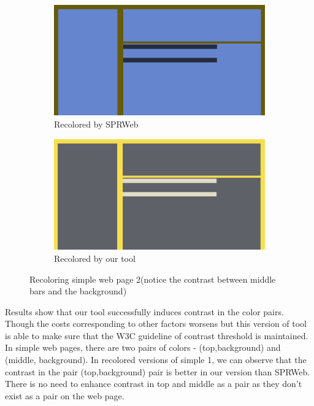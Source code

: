 \begin{figure}
\centering
\begin{subfigure}{.5\textwidth}
  \centering
  \includegraphics[width=0.9\linewidth]{recoloredSprweb2.png}
  \caption{Recolored by SPRWeb}
  \label{fig:sub1}
\end{subfigure}%
\begin{subfigure}{.5\textwidth}
  \centering
  \includegraphics[width=0.9\linewidth]{recoloredOurs2.png}
  \caption{Recolored by our tool}
  \label{fig:sub2}
\end{subfigure}
\caption{Recoloring simple web page 2(notice the contrast between middle bars and the background)}
\label{fig:test}
\end{figure}

Results show that our tool successfully induces contrast in the color pairs. Though the costs corresponding to other factors worsens but this version of tool is able to make sure that the W3C guideline of contrast threshold is maintained. In simple web pages, there are two pairs of colors - (top,background) and (middle, background). In recolored versions of simple 1, we can observe that the contrast in the pair (top,background) pair is better in our version than SPRWeb. There is no need to enhance contrast in top and middle as a pair as they don't exist as a pair on the web page. 

